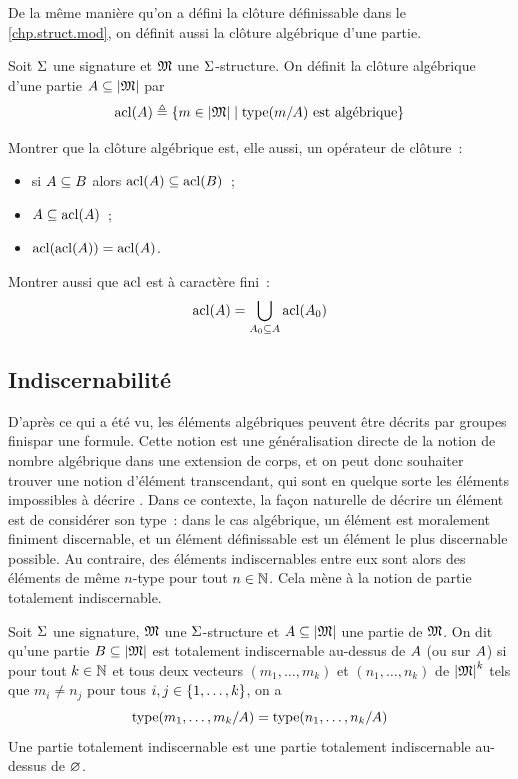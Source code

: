 De la même manière qu'on a défini la clôture définissable dans le
\cref{chp.struct.mod}, on définit aussi la clôture algébrique d'une partie.

\begin{definition}
  Soit $\Sigma$ une signature et $\mathfrak{M}$ une $\Sigma$-structure. On définit
  la clôture algébrique d'une partie $A\subseteq\left\vert \mathfrak{M}\right\vert$ par
  \[\operatorname{acl}(A) \triangleq
  \left\{ m \in \left\vert \mathfrak{M}\right\vert \;\middle\vert\; \operatorname{type}(m/A)\text{ est algébrique} \right\}\]
\end{definition}

\begin{exercise}
  Montrer que la clôture algébrique est, elle aussi, un opérateur de clôture~:
  \begin{itemize}
  \item si $A\subseteq B$ alors $\operatorname{acl}(A)\subseteq\operatorname{acl}(B)$~;
  \item $A\subseteq\operatorname{acl}(A)$~;
  \item $\operatorname{acl}(\operatorname{acl}(A)) = \operatorname{acl}(A)$.
  \end{itemize}
  Montrer aussi que $\operatorname{acl}$ est à caractère fini~:
  \[\operatorname{acl}(A) = \bigcup_{A_0\subseteq A} \operatorname{acl}(A_0)\]
\end{exercise}

\subsection{Indiscernabilité}

D'après ce qui a été vu, les éléments algébriques peuvent être décrits \og par
groupes finis\fg par une formule. Cette notion est une généralisation directe
de la notion de nombre algébrique dans une extension de corps, et on peut donc
souhaiter trouver une notion d'élément transcendant, qui sont en quelque sorte
les éléments \og impossibles à décrire \fg. Dans ce contexte, la façon naturelle
de décrire un élément est de considérer son type~: dans le cas algébrique, un
élément est moralement \og finiment discernable\fg, et un élément définissable
est un élément le plus discernable possible. Au contraire, des éléments
indiscernables entre eux sont alors des éléments de même $n$-type pour tout
$n\in\mathbb N$. Cela mène à la notion de partie totalement indiscernable.

\begin{definition}
  Soit $\Sigma$ une signature, $\mathfrak{M}$ une $\Sigma$-structure et
  $A\subseteq\left\vert \mathfrak{M}\right\vert$ une partie de $\mathfrak{M}$. On dit qu'une
  partie $B\subseteq\left\vert \mathfrak{M}\right\vert$ est totalement indiscernable au-dessus de
  $A$ (ou sur $A$) si pour tout $k \in \mathbb N$ et tous deux vecteurs
  $(m_1,\ldots,m_k)$ et $(n_1,\ldots,n_k)$ de $\left\vert \mathfrak{M}\right\vert^k$ tels que $m_i\neq n_j$
  pour tous $i,j\in\{1,\ldots,k\}$, on a
  \[\operatorname{type}(m_1,\ldots,m_k/A) = \operatorname{type}(n_1,\ldots,n_k/A)\]
  Une partie totalement indiscernable est une partie totalement indiscernable
  au-dessus de $\varnothing$.
\end{definition}

